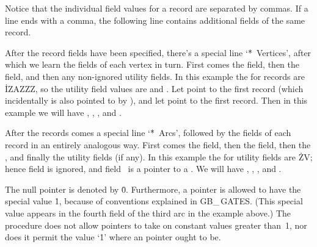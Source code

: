 Notice that the individual field values for a record are separated by commas.
If a line ends with a comma, the following line contains
additional fields of the same record.

After the  record fields have been specified, there's a special
line
`\.{*\ Vertices}', after which we learn the fields of each vertex in turn.
First comes the  field, then the  field, and then any
non-ignored utility fields. In this example the 
for  records are \.{IZAZZZ}, so the utility field values are
 and . Let  point to the first  record (which incidentally
is also pointed to by ), and let  point to the
first
 record. Then in this example we will have ,
, , and .

After the  records comes a special line `\.{*\ Arcs}', followed
by
the fields of each  record in an entirely analogous way. First
comes the  field, then the  field, then the , and finally
the utility fields (if any). In this example the 
for  utility fields are \.{ZV}; hence field  is ignored,
and
field~ is a pointer to a . We will have , ,
, and .

The null pointer \PB{$\NULL$} is denoted by \.0. Furthermore, a 
pointer
is allowed to have the special value \.1, because of conventions
explained in {\sc GB\_\,GATES}. (This special value appears in the fourth
field of the third arc in the example above.) The 
procedure
does not allow  pointers to take on constant values
greater than~1, nor does it permit the value `\.1' where an 
pointer ought to be.

